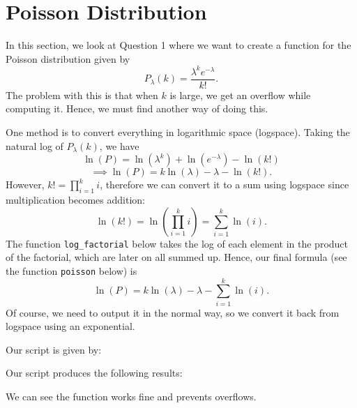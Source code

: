 \section{Poisson Distribution}

In this section, we look at Question 1
where we want to create a function for the Poisson distribution given by
\[ P_{\lambda}(k)=\frac{\lambda^k e^{-\lambda}}{k!}. \]
The problem with this is that when \( k \) is large, we get an overflow while
computing it.
Hence, we must find another way of doing this.

One method is to convert everything in logarithmic space (logspace).
Taking the natural log of \(P_{\lambda}(k)\), we have
\[ \ln{(P)} = \ln{(\lambda^k)} + \ln{(e^{-\lambda})} - \ln{(k!)} \]
\[ \implies \ln{(P)} = k\ln{(\lambda)} - \lambda - \ln{(k!)}. \]
However, \(k! = \prod_{i=1}^k i\), therefore we can convert it to a sum using
logspace since multiplication becomes addition:
\[ \ln{(k!)} = \ln{\left(\prod_{i=1}^k i\right)} = \sum_{i=1}^k\ln{(i)}. \]
The function \texttt{log\_factorial} below takes the log of each element in the
product of the factorial, which are later on all summed up.
Hence, our final formula (see the function
\texttt{poisson} below) is
\[ \ln{(P)} = k\ln{(\lambda)} - \lambda - \sum_{i=1}^k\ln{(i)}. \]
Of course, we need to output it in the normal way, so we convert it back from
logspace using an exponential.

Our script is given by:


Our script produces the following results:


We can see the function works fine and prevents overflows.
